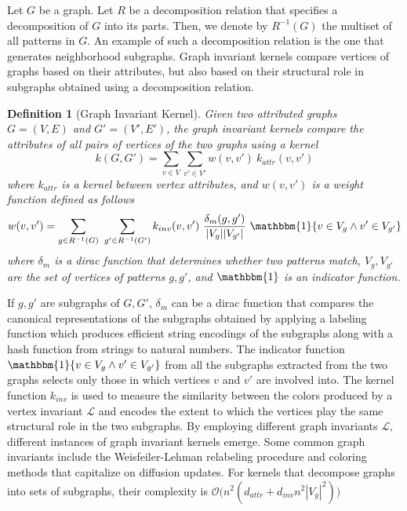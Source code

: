 \documentclass[twoside,11pt]{article}
\newtheorem{definition}{Definition}
\begin{document}
Let $G$ be a graph.
Let $R$ be a decomposition relation that specifies a decomposition of $G$ into its parts.
Then, we denote by $R^{-1}(G)$ the multiset of all patterns in $G$.
An example of such a decomposition relation is the one that generates neighborhood subgraphs.
Graph invariant kernels compare vertices of graphs based on their attributes, but also based on their  structural role in subgraphs obtained using a decomposition relation.
\begin{definition}[Graph Invariant Kernel]
  Given two attributed graphs $G=(V,E)$ and $G'=(V',E')$, the graph invariant kernels compare the attributes of all pairs of vertices of the two graphs using a kernel
  \begin{equation}
    k(G, G') = \sum_{v \in V} \sum_{v' \in V'} w(v, v') \ k_{attr}(v, v')
  \end{equation}
  where $k_{attr}$ is a kernel between vertex attributes, and $w(v, v')$ is a weight function defined as follows
  \begin{equation}
    w(v, v') = \sum_{g \in R^{-1}(G)} \ \sum_{g' \in R^{-1}(G')} k_{inv}(v, v') \ \frac{\delta_m(g, g')}{|V_{g}| |V_{g'}|} \ \mathbbm{1} \{ v \in V_{g} \wedge v' \in V_{g'} \}
  \end{equation}
  where $\delta_m$ is a dirac function that determines whether two patterns match, $V_{g},V_{g'}$ are the set of vertices of patterns $g, g'$, and $\mathbbm{1}$ is an indicator function. 
\end{definition}
If $g, g'$ are subgraphs of $G, G'$, $\delta_m$ can be a dirac function that compares the canonical representations of the subgraphs obtained by applying a labeling function which produces efficient string encodings of the subgraphs along with a hash function from strings to natural numbers.  
The indicator function $\mathbbm{1} \{ v \in V_{g} \wedge v' \in V_{g'} \}$ from all the subgraphs extracted from the two graphs selects only those in which vertices $v$ and $v'$ are involved into.
The kernel function $k_{inv}$ is used to measure the similarity between the colors produced by a vertex invariant $\mathcal{L}$ and encodes the extent to which the vertices play the same structural role in the two subgraphs.
By employing different graph invariants $\mathcal{L}$, different instances of graph invariant kernels emerge.
Some common graph invariants include the Weisfeiler-Lehman relabeling procedure and coloring methods that capitalize on diffusion updates.
For kernels that decompose graphs into sets of subgraphs, their complexity is $\mathcal{O} \big( n^2(d_{attr}+d_{inv}n^2|V_g|^2) \big)$
\end{document}
